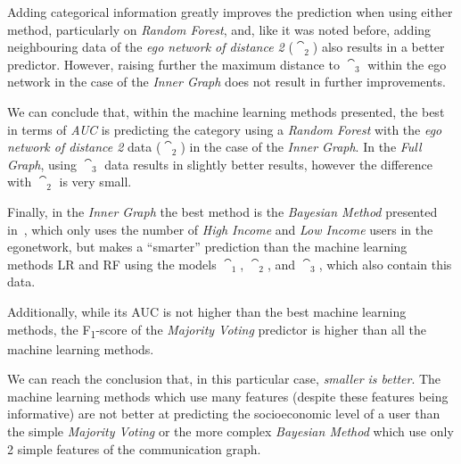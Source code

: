 Adding categorical information greatly improves the prediction when using either method, particularly on \emph{Random Forest}, and, like it was noted before, adding neighbouring data of the \emph{ego network of distance 2} ($\cat_2$) also results in a better predictor. However, raising further the maximum distance to $\cat_3$ within the {ego network} in the case of the \emph{Inner Graph} does not result in further improvements.

We can conclude that, within the {machine learning} methods presented, the best in terms of \emph{AUC} is predicting the category using a \emph{Random Forest} with the \emph{ego network of distance 2} data ($\cat_2$) in the case of the \emph{Inner Graph}. In the \emph{Full Graph}, using $\cat_3$ data results in slightly better results, however the difference with $\cat_2$ is very small.

Finally, in the \emph{Inner Graph} the best method is the \emph{Bayesian Method} presented in~\cite{fixmanasonam2016}, which only uses the number of \emph{High Income} and \emph{Low Income} users in the egonetwork, but makes a ``smarter'' prediction than the {machine learning} methods LR and RF using the models $\cat_1$, $\cat_2$, and $\cat_3$, which also contain this data. 

Additionally, while its AUC is not higher than the best {machine learning} methods, the F\textsubscript{1}-score of the \emph{Majority Voting} predictor is higher than all the {machine learning} methods.

We can reach the conclusion that, in this particular case, \emph{smaller is better}. The {machine learning} methods which use many features (despite these features being informative) are not better at predicting the socioeconomic level of a user than the simple \emph{Majority Voting} or the more complex \emph{Bayesian Method} which use only 2 simple features of the communication graph.


